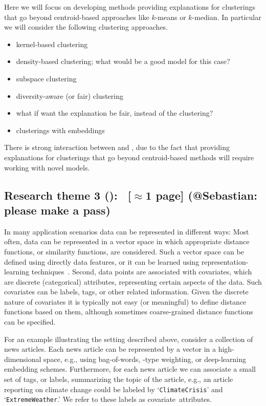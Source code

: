 \documentclass[a4paper,11pt]{article}
\begin{document}
Here we will focus on developing methods providing explanations for clusterings 
that go beyond centroid-based approaches like $k$-means or $k$-median.
In particular we will consider the following clustering approaches.
\begin{itemize}
\setlength{\itemsep}{-2pt}
\item kernel-based clustering
\item density-based clustering; what would be a good model for this case?
\item subspace clustering \hfill{}
\item diversity-aware (or fair) clustering \hfill{}
\item what if want the explanation be fair, instead of the clustering?
\item clusterings with embeddings
\end{itemize}

There is strong interaction between \rto and \rtw, 
due to the fact that providing explanations for clusterings that go beyond centroid-based methods
will require working with novel models.

\subsection*{Research theme 3 (\rth): \covariates\ {\color{orange}[$\approx$1 page]} {\color{teal}(@Sebastian: please make a pass)}}

In many application scenarios data can be represented in different ways: 
Most often, data can be represented in a vector space
in which appropriate distance functions, or similarity functions, are considered.
Such a vector space can be defined using directly data features, 
or it can be learned using representation-learning techniques~\cite{hamilton2017representation,wang2020survey}.
Second, data points are associated with covariates, 
which are discrete (categorical) attributes, 
representing certain aspects of the data. 
Such covariates can be labels, tags, or other related information.
Given the discrete nature of covariates it is typically not easy (or meaningful)
to define distance functions based on them, 
although sometimes coarse-grained distance functions can be specified.

For an example illustrating the setting described above, 
consider a collection of news articles. 
Each news article can be represented by a vector in a high-dimensional space, 
e.g., using bag-of-words, \tfidf-type weighting, or deep-learning embedding schemes. 
Furthermore, for each news article we can associate a small 
set of tags, or labels, summarizing the topic of the article, 
e.g., an article reporting on climate change could be labeled by
`\texttt{\small ClimateCrisis}' and `\texttt{\small ExtremeWeather}.'
We refer to these labels as covariate~attributes.
\end{document}
